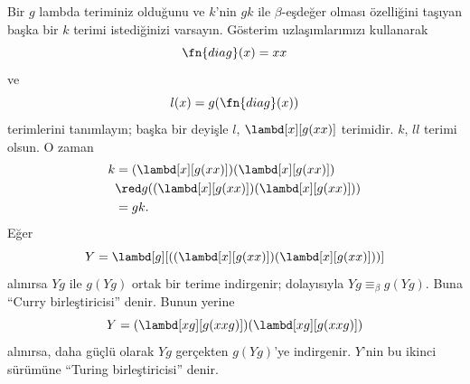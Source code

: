 \documentclass[../../../include/open-logic-section]{subfiles}
\begin{document}

Bir $g$ lambda teriminiz olduğunu ve $k$'nin $gk$ ile $\beta$-eşdeğer olması
özelliğini taşıyan başka bir $k$ terimi istediğinizi varsayın. Gösterim
uzlaşımlarımızı kullanarak
\[
\fn{diag}(x) = xx
\]
ve
\[
l(x) = g(\fn{diag}(x))
\]
terimlerini tanımlayın; başka bir deyişle $l$,
$\lambd[x][g(xx)]$ terimidir. $k$, $ll$ terimi olsun. O zaman
\begin{align*}
k & = (\lambd[x][g(xx)])(\lambd[x][g(xx)]) \\
& \red  g((\lambd[x][g(xx)])(\lambd[x][g(xx)])) \\
& = gk.
\end{align*}
Eğer
\[
Y = \lambd[g][((\lambd[x][g(xx)])(\lambd[x][g(xx)]))]
\]
alınırsa $Yg$ ile $g(Yg)$ ortak bir terime indirgenir; dolayısıyla
$Yg\equiv_\beta g(Yg)$. Buna ``Curry birleştiricisi'' denir. Bunun yerine
\[
Y = (\lambd[xg][g(xxg)])(\lambd[xg][g(xxg)])
\]
alınırsa, daha güçlü olarak $Yg$ gerçekten $g(Yg)$'ye indirgenir. $Y$'nin
bu ikinci sürümüne ``Turing birleştiricisi'' denir.
\end{document}
